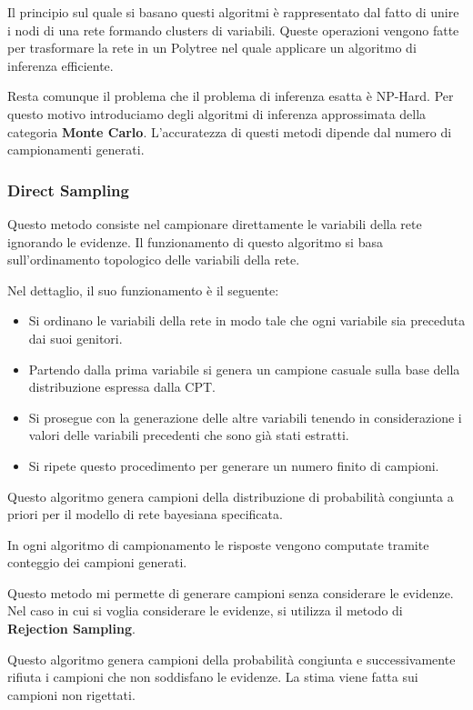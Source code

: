 Il principio sul quale si basano questi algoritmi è rappresentato dal fatto di
unire i nodi di una rete formando clusters di variabili. Queste operazioni vengono
fatte per trasformare la rete in un Polytree nel quale applicare un algoritmo di
inferenza efficiente.

Resta comunque il problema che il problema di inferenza esatta è NP-Hard. Per
questo motivo introduciamo degli algoritmi di inferenza approssimata della categoria
\textbf{Monte Carlo}. L'accuratezza di questi metodi dipende dal numero di campionamenti
generati.
\subsubsection{Direct Sampling}
Questo metodo consiste nel campionare direttamente le variabili della rete ignorando
le evidenze. Il funzionamento di questo algoritmo si basa sull'ordinamento
topologico delle variabili della rete.

Nel dettaglio, il suo funzionamento è il seguente:
\begin{itemize}
    \item Si ordinano le variabili della rete in modo tale che ogni variabile
          sia preceduta dai suoi genitori.
    \item Partendo dalla prima variabile si genera un campione casuale sulla base
          della distribuzione espressa dalla CPT.
    \item Si prosegue con la generazione delle altre variabili tenendo in
          considerazione i valori delle variabili precedenti che sono già stati
          estratti.
    \item Si ripete questo procedimento per generare un numero finito di campioni.
\end{itemize}
Questo algoritmo genera campioni della distribuzione di probabilità congiunta a
priori per il modello di rete bayesiana specificata.

In ogni algoritmo di campionamento le risposte vengono computate tramite conteggio
dei campioni generati.

Questo metodo mi permette di generare campioni senza considerare le evidenze. Nel
caso in cui si voglia considerare le evidenze, si utilizza il metodo di \textbf{Rejection
    Sampling}.

Questo algoritmo genera campioni della probabilità congiunta e successivamente
rifiuta i campioni che non soddisfano le evidenze. La stima viene fatta sui
campioni non rigettati.

